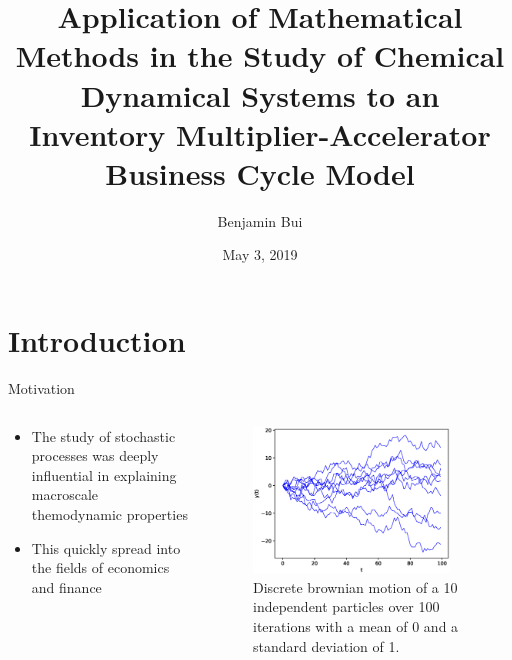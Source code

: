 \documentclass{beamer}
\title{Application of Mathematical Methods in the Study of Chemical Dynamical Systems to an Inventory Multiplier-Accelerator Business Cycle Model}
\author{Benjamin Bui}
\date{May 3, 2019}
\begin{document}
\begin{frame}
	\titlepage
\end{frame}

\section{Introduction}
\begin{frame}{Motivation}
	\begin{columns}
	\begin{column}{0.5\textwidth}
	\begin{itemize}
		\item The study of stochastic processes was deeply influential in explaining macroscale themodynamic properties

		\item This quickly spread into the fields of economics and finance 
	\end{itemize}
	\end{column}
	\begin{column}{0.5\textwidth}
		\begin{figure}
			\centering
			\includegraphics[width=0.9\textwidth]{brownian_motion.eps}
			\caption{Discrete brownian motion of a 10 independent particles over 100 iterations with a mean of 0 and a standard deviation of 1.}
		\end{figure}
	\end{column}
	\end{columns}
\end{frame}
\end{document}
